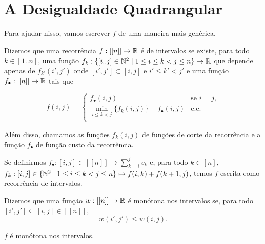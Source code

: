 \section{A Desigualdade Quadrangular}
Para ajudar nisso, vamos escrever $f$ de uma maneira mais genérica.

\begin{defi} \label{rec_int}
Dizemos que uma recorrência $f : [[n]] \to \mathbb{R}$ é de intervalos se existe, para todo $k \in [1..n]$, uma função $f_k : \{[i..j] \in \mathbb{N}^2 \mid 1 \leq i \leq k < j \leq n \} \to \mathbb{R}$ que depende apenas de $f_{k'}(i',j')$ onde $[i',j'] \subset [i,j]$ e $i' \leq k' < j'$ e uma função $f_\bullet : [[n]] \to \mathbb{R}$ tais que

$$
f(i,j) = \begin{cases}
    f_\bullet (i,j) & \text{se } i = j, \\
    \min\limits_{i \leq k < j} \Big\{ f_k(i,j) \Big\} + f_\bullet (i,j) & \text{c.c.} \\
\end{cases}
$$

Além disso, chamamos as funções $f_k(i,j)$ de funções de corte da recorrência e a função $f_\bullet$ de função custo da recorrência.
\end{defi}

Se definirmos $f_\bullet : [i,j] \in [[n]] \mapsto \sum\limits_{k=i}^j v_k$ e, para todo $k \in [n]$, $f_k : [i,j] \in \{ \mathbb{N}^2 \mid 1 \leq i \leq k < j \leq n \} \mapsto f(i,k) + f(k+1,j)$, temos $f$ escrita como recorrência de intervalos.

\begin{defi} \label{mon_int}
Dizemos que uma função $w : [[n]] \to \mathbb{R}$ é monótona nos intervalos se, para todo $[i',j'] \subseteq [i,j] \in [[n]]$,
$$ w(i',j') \leq w(i,j). $$
\end{defi}

\begin{prop}
$f$ é monótona nos intervalos.
\end{prop}

